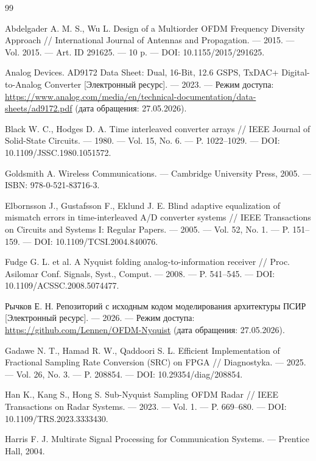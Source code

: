 \documentclass[a4paper,12pt]{article}
\numberwithin{equation}{section}
\begin{document}
\begin{thebibliography}{99}

Abdelgader A. M. S., Wu L. Design of a Multiorder OFDM Frequency Diversity Approach // International Journal of Antennas and Propagation. --- 2015. --- Vol. 2015. --- Art. ID 291625. --- 10 p. --- DOI: 10.1155/2015/291625.

Analog Devices. AD9172 Data Sheet: Dual, 16-Bit, 12.6 GSPS, TxDAC+ Digital-to-Analog Converter [Электронный ресурс]. --- 2023. --- Режим доступа: \url{https://www.analog.com/media/en/technical-documentation/data-sheets/ad9172.pdf} (дата обращения: 27.05.2026).

Black W. C., Hodges D. A. Time interleaved converter arrays // IEEE Journal of Solid-State Circuits. --- 1980. --- Vol. 15, No. 6. --- P. 1022--1029. --- DOI: 10.1109/JSSC.1980.1051572.

Goldsmith A. Wireless Communications. --- Cambridge University Press, 2005. --- ISBN: 978-0-521-83716-3.

Elbornsson J., Gustafsson F., Eklund J. E. Blind adaptive equalization of mismatch errors in time-interleaved A/D converter systems // IEEE Transactions on Circuits and Systems I: Regular Papers. --- 2005. --- Vol. 52, No. 1. --- P. 151--159. --- DOI: 10.1109/TCSI.2004.840076.

Fudge G. L. et al. A Nyquist folding analog-to-information receiver // Proc. Asilomar Conf. Signals, Syst., Comput. --- 2008. --- P. 541--545. --- DOI: 10.1109/ACSSC.2008.5074477.

Рычков Е. Н. Репозиторий с исходным кодом моделирования архитектуры ПСИР [Электронный ресурс]. --- 2026. --- Режим доступа: \url{https://github.com/Lennen/OFDM-Nyquist} (дата обращения: 27.05.2026).

Gadawe N. T., Hamad R. W., Qaddoori S. L. Efficient Implementation of Fractional Sampling Rate Conversion (SRC) on FPGA // Diagnostyka. --- 2025. --- Vol. 26, No. 3. --- P. 208854. --- DOI: 10.29354/diag/208854.

Han K., Kang S., Hong S. Sub-Nyquist Sampling OFDM Radar // IEEE Transactions on Radar Systems. --- 2023. --- Vol. 1. --- P. 669--680. --- DOI: 10.1109/TRS.2023.3333430.

Harris F. J. Multirate Signal Processing for Communication Systems. --- Prentice Hall, 2004.


\end{thebibliography}
\end{document}
